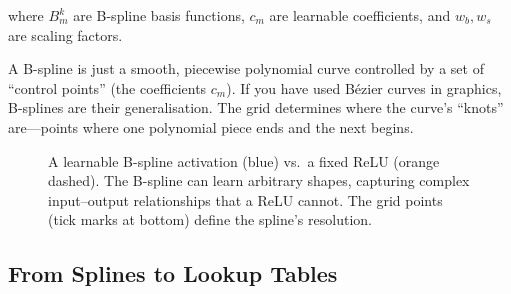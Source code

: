 where $B_m^k$ are B-spline basis functions, $c_m$ are learnable
coefficients, and $w_b, w_s$ are scaling factors.

\begin{engineernote}
A B-spline is just a smooth, piecewise polynomial curve controlled
by a set of ``control points'' (the coefficients $c_m$). If you have
used Bézier curves in graphics, B-splines are their generalisation.
The grid determines where the curve's ``knots'' are---points where
one polynomial piece ends and the next begins.
\end{engineernote}

\begin{figure}[htbp]
\centering
{}
\caption{A learnable B-spline activation (blue) vs.\ a fixed ReLU
  (orange dashed). The B-spline can learn arbitrary shapes, capturing
  complex input--output relationships that a ReLU cannot. The grid
  points (tick marks at bottom) define the spline's resolution.}
\label{fig:kan-spline}
\end{figure}

\subsection{From Splines to Lookup Tables}
\label{sec:lut-compilation}

